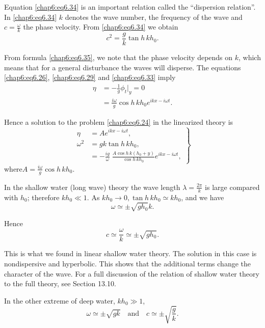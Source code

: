 Equation \eqref{chap6:eq6.34} is an important relation called the ``dispersion relation''. In \eqref{chap6:eq6.34} $k$ denotes the wave number, the frequency of the wave and $c=\frac{\omega}{k}$ the phase velocity. From \eqref{chap6:eq6.34} we obtain
\begin{equation}
c^2=\frac{g}{k}\tan h\,kh_0.\tag{6.35}\label{chap6:eq6.35}
\end{equation}

From formula \eqref{chap6:eq6.35}, we note that the phase velocity depends on $k$, which means that for a general disturbance the waves will disperse. The equations \eqref{chap6:eq6.26}, \eqref{chap6:eq6.29} and \eqref{chap6:eq6.33} imply 
\begin{align*}
\eta &= -\frac{1}{g}\phi_t|_y=0\\
&=\frac{i\omega}{g}\cos h\,kh_0e^{ikx-i\omega t}.
\end{align*}

Hence a solution to the problem \eqref{chap6:eq6.24} in the linearized theory is 
\begin{equation}
\left.
\begin{aligned}
\eta&=Ae^{ikx-i\omega t},\\
\omega^2 &= gk\tan h\,kh_0,\\
&= -\frac{ig}{\omega}\;\frac{A\cos h \,k(h_0+y)}{\cos h\,kh_0} e^{ikx-i\omega t},
\end{aligned}
\right\}\tag{6.36}\label{chap6:eq6.36}
\end{equation}
where\pageoriginale $A=\frac{i\omega}{g}\cos h\,kh_0$.

In the shallow water (long wave) theory the wave length $\lambda=\frac{2\pi}{k}$ is large compared with $h_0$; therefore $kh_0\ll 1$. As $kh_0\to 0,\tan h\,kh_0\simeq kh_0$, and we have 
$$
\omega\simeq\pm\sqrt{gh_0}k.
$$

Hence
\begin{equation}
c\simeq\frac{\omega}{k}\simeq\pm\sqrt{gh_0}.\tag{6.37}\label{chap6:eq6.37}
\end{equation}

This is what we found in linear shallow water theory. The solution in this case is nondispersive and hyperbolic. This shows that the additional terms change the character of the wave. For a full discussion of the relation of shallow water theory to the full theory, see \cite{key1} Section 13.10.

In the other extreme of deep water, \ie $kh_0\gg 1$,
\begin{equation}
\omega\simeq\pm\sqrt{gk}\quad\text{and}\quad c\simeq\pm \sqrt{\frac{g}{k}}. \tag{6.38}\label{chap6:eq6.38}
\end{equation}

